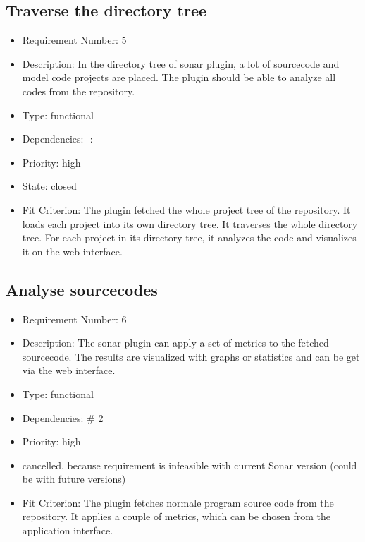 \subsection{Traverse the directory tree}
\begin{itemize}
\item Requirement Number: 5
\item Description: In the directory tree of sonar plugin, a lot of sourcecode and model code projects are placed. The plugin should be able to analyze all codes from the repository.
\item Type: functional
\item Dependencies: -:-
\item Priority: high
\item State: closed
\item Fit Criterion: The plugin fetched the whole project tree of the repository. It loads each project into its own directory tree. It traverses the whole directory tree. For each project in its directory tree, it analyzes the code and visualizes it on the web interface.
\end{itemize}

\subsection{Analyse sourcecodes}
\begin{itemize}
\item Requirement Number: 6
\item Description: The sonar plugin can apply a set of metrics to the fetched sourcecode. The results are visualized with graphs or statistics and can be get via the web interface.
\item Type: functional
\item Dependencies: \# 2
\item Priority: high
\item cancelled, because requirement is infeasible with current Sonar version (could be with future versions)
\item Fit Criterion: The plugin fetches normale program source code from the repository. It applies a couple of metrics, which can be chosen from the application interface.
\end{itemize}

